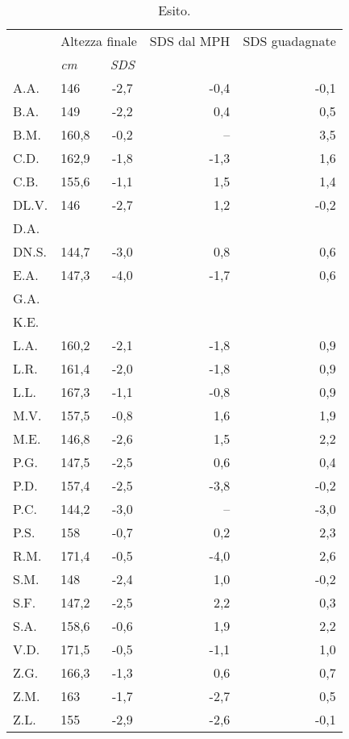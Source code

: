 \begin{table}[!h]
\begin{center}
\addtolength{\tabcolsep}{12pt}
\renewcommand{\arraystretch}{1.1}
\begin{tabular}{llcrr}
\toprule
 & \multicolumn{2}{c}{Altezza finale} 	& SDS dal MPH	& SDS guadagnate \\
\cmidrule(r){2-3}
  & \emph{cm} 	& \emph{SDS}  			& 				& \\
\midrule
A.A.	& 146   & -2,7  & -0,4  & -0,1  \\
B.A.	& 149   & -2,2  & 0,4   & 0,5   \\
B.M.	& 160,8 & -0,2  & --    & 3,5   \\
C.D.	& 162,9 & -1,8  & -1,3  & 1,6   \\
C.B.	& 155,6 & -1,1  & 1,5   & 1,4   \\
DL.V.	& 146   & -2,7  & 1,2   & -0,2  \\
D.A.	&       &       &       &       \\
DN.S.	& 144,7 & -3,0  & 0,8   & 0,6   \\
E.A.	& 147,3 & -4,0  & -1,7  & 0,6   \\
G.A.	&       &       &       &       \\
K.E.	&       &       &       &       \\
L.A.	& 160,2 & -2,1  & -1,8  & 0,9   \\
L.R.	& 161,4 & -2,0  & -1,8  & 0,9   \\
L.L.	& 167,3 & -1,1  & -0,8  & 0,9   \\
M.V.	& 157,5 & -0,8  & 1,6   & 1,9   \\
M.E.	& 146,8 & -2,6  & 1,5   & 2,2   \\
P.G.	& 147,5 & -2,5  & 0,6   & 0,4   \\
P.D.	& 157,4 & -2,5  & -3,8  & -0,2  \\
P.C.	& 144,2 & -3,0  & --    & -3,0  \\
P.S.	& 158   & -0,7  & 0,2   & 2,3   \\
R.M.	& 171,4 & -0,5  & -4,0  & 2,6   \\
S.M.	& 148   & -2,4  & 1,0   & -0,2  \\
S.F.	& 147,2 & -2,5  & 2,2   & 0,3   \\
S.A.	& 158,6 & -0,6  & 1,9   & 2,2   \\
V.D.	& 171,5 & -0,5  & -1,1  & 1,0   \\
Z.G.	& 166,3 & -1,3  & 0,6   & 0,7   \\
Z.M.	& 163   & -1,7  & -2,7  & 0,5   \\
Z.L.	& 155   & -2,9  & -2,6  & -0,1  \\
\bottomrule
\end{tabular}
\end{center}
\caption{Esito.}
\label{tab:Esito}
\end{table}